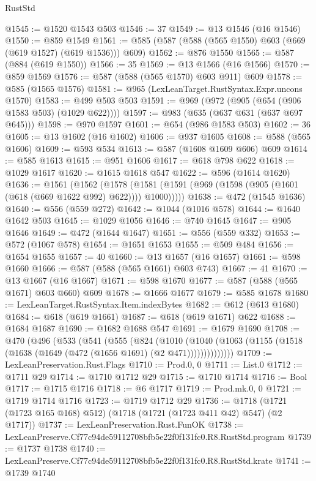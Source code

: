 \begin{lexlean}{RustStd}
\begin{coremodule}
@1545 := @1520 @1543 @503
@1546 := 37
@1549 := @13 @1546 (@16 @1546)
@1550 := @859 @1549
@1561 := @585 (@587 (@588 (@565 @1550) @603 (@669 (@619 @1527) (@619 @1536))) @609)
@1562 := @876 @1550
@1565 := @587 (@884 (@619 @1550))
@1566 := 35
@1569 := @13 @1566 (@16 @1566)
@1570 := @859 @1569
@1576 := @587 (@588 (@565 @1570) @603 @911) @609
@1578 := @585 (@1565 @1576)
@1581 := @965 (LexLeanTarget.RustSyntax.Expr.uncons @1570)
@1583 := @499 @503 @503
@1591 := @969 (@972 (@905 (@654 (@906 @1583 @503) (@1029 @622))))
@1597 := @983 (@635 (@637 @631 (@637 @697 @645)))
@1598 := @970 @1597
@1601 := @654 (@986 @1583 @503)
@1602 := 36
@1605 := @13 @1602 (@16 @1602)
@1606 := @937 @1605
@1608 := @588 (@565 @1606)
@1609 := @593 @534
@1613 := @587 (@1608 @1609 @606) @609
@1614 := @585 @1613
@1615 := @951 @1606
@1617 := @618 @798 @622
@1618 := @1029 @1617
@1620 := @1615 @1618 @547
@1622 := @596 (@1614 @1620)
@1636 := @1561
    (@1562
      (@1578 (@1581 (@1591 (@969 (@1598 (@905 (@1601 (@618 (@669 @1622 @992) @622)))) @1000)))))
@1638 := @472 (@1545 @1636)
@1640 := @556 (@559 @272)
@1642 := @1044 (@1016 @578)
@1644 := @1640 @1642 @503
@1645 := @1029 @1056
@1646 := @740 @1645
@1647 := @905 @1646
@1649 := @472 (@1644 @1647)
@1651 := @556 (@559 @332)
@1653 := @572 (@1067 @578)
@1654 := @1651 @1653
@1655 := @509 @484
@1656 := @1654 @1655
@1657 := 40
@1660 := @13 @1657 (@16 @1657)
@1661 := @598 @1660
@1666 := @587 (@588 (@565 @1661) @603 @743)
@1667 := 41
@1670 := @13 @1667 (@16 @1667)
@1671 := @598 @1670
@1677 := @587 (@588 (@565 @1671) @603 @660) @609
@1678 := @1666 @1677
@1679 := @585 @1678
@1680 := LexLeanTarget.RustSyntax.Item.indexBytes
@1682 := @612 (@613 @1680)
@1684 := @618 (@619 @1661)
@1687 := @618 (@619 @1671) @622
@1688 := @1684 @1687
@1690 := @1682 @1688 @547
@1691 := @1679 @1690
@1708 := @470
    (@496
      (@533
        (@541
          (@555
            (@824
              (@1010
                (@1040 (@1063 (@1155 (@1518 (@1638 (@1649 (@472 (@1656 @1691) (@2 @471))))))))))))))
@1709 := LexLeanPreservation.Rust.Flags
@1710 := Prod.{0, 0}
@1711 := List.{0}
@1712 := @1711 @29
@1714 := @1710 @1712 @29
@1715 := @1710 @1714
@1716 := Bool
@1717 := @1715 @1716
@1718 := @6 @1717
@1719 := Prod.mk.{0, 0}
@1721 := @1719 @1714 @1716
@1723 := @1719 @1712 @29
@1736 := @1718 (@1721 (@1723 @165 @168) @512) (@1718 (@1721 (@1723 @411 @42) @547) (@2 @1717))
@1737 := LexLeanPreservation.Rust.FunOK
@1738 := LexLeanPreserve.Cf77c94de59112708bfb5e22f0f131fc0.R8.RustStd.program
@1739 := @1737 @1738
@1740 := LexLeanPreserve.Cf77c94de59112708bfb5e22f0f131fc0.R8.RustStd.krate
@1741 := @1739 @1740

\end{coremodule}
\end{lexlean}
